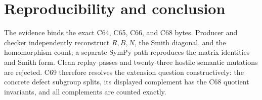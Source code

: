 \documentclass[10pt]{article}
\begin{document}
\section{Reproducibility and conclusion}
The evidence binds the exact C64, C65, C66, and C68 bytes.  Producer and
checker independently reconstruct $R,B,N$, the Smith diagonal, and the
homomorphism count; a separate SymPy path reproduces the matrix identities and
Smith form.  Clean replay passes and twenty-three hostile semantic mutations
are rejected.  C69 therefore resolves the extension question constructively:
the concrete defect subgroup splits, its displayed complement has the C68
quotient invariants, and all complements are counted exactly.
\end{document}
